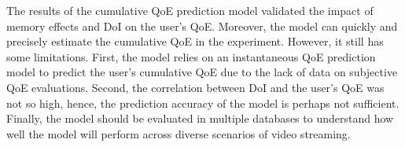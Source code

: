 The results of the cumulative QoE prediction model validated the impact of memory effects and DoI on the user's QoE.
Moreover, the model can quickly and precisely estimate the cumulative QoE in the experiment.
However, it still has some limitations.
First, the model relies on an instantaneous QoE prediction model to predict the user's cumulative QoE due to the lack of data on subjective QoE evaluations.
Second, the correlation between DoI and the user's QoE was not so high, hence, the prediction accuracy of the model is perhaps not sufficient.
Finally, the model should be evaluated in multiple databases to understand how well the model will perform across diverse scenarios of video streaming.
